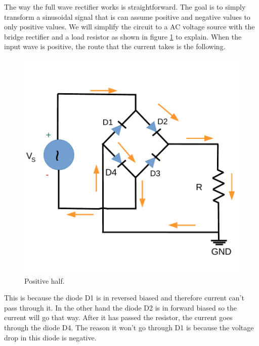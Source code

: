 The way the full wave rectifier works is straightforward. The goal is to
simply transform a sinusoidal signal that is can assume positive and negative values to only positive values.
We will simplify the circuit to a AC voltage source with the bridge rectifier and a load resistor as shown in figure \ref{fig:rc2} to explain.
When the input wave is positive, the route that the current takes is the following.
\begin{figure}[h] \centering
    \includegraphics[scale=0.42]{lab3 _positive.pdf}
    \caption{Positive half.}
    \label{fig:rc2}
\end{figure}

This is because the diode D1 is in reversed biased and therefore
current can't pass through it. In the other hand the diode D2 is in forward biased
so the current will go that way.
After it has passed the resistor, the current goes through the diode D4.
The reason it won't go through D1 is because the voltage drop in this diode
is negative.

